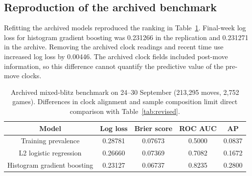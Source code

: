 \subsection{Reproduction of the archived benchmark}
Refitting the archived models reproduced the ranking in Table~\ref{tab:baseline}. Final-week log loss for histogram gradient boosting was 0.231266 in the replication and 0.231271 in the archive. Removing the archived clock readings and recent time use increased log loss by 0.00446. The archived clock fields included post-move information, so this difference cannot quantify the predictive value of the pre-move clocks.
\begin{table}[H]\centering
\caption{Archived mixed-blitz benchmark on 24--30 September (213,295 moves, 2,752 games). Differences in clock alignment and sample composition limit direct comparison with Table~\ref{tab:revised}.}\label{tab:baseline}
\begin{tabular}{@{}ccccc@{}}\toprule
Model & Log loss & Brier score & ROC AUC & AP \\\midrule
Training prevalence & 0.28781 & 0.07673 & 0.5000 & 0.0837 \\
L2 logistic regression & 0.26660 & 0.07369 & 0.7082 & 0.1672 \\
Histogram gradient boosting & 0.23127 & 0.06737 & 0.8235 & 0.2800 \\\bottomrule
\end{tabular}
\end{table}
